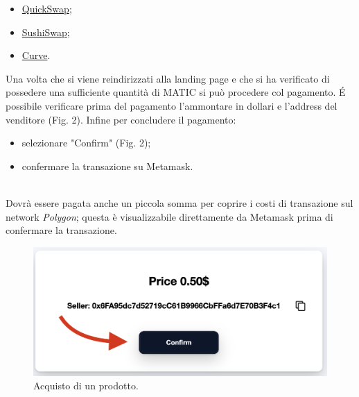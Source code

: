 \documentclass[a4paper, 12pt]{article}
\begin{document}
\begin{itemize}
\item \href{https://www.quickswap.exchange}{QuickSwap};
\item \href{https://app.sushi.com/}{SushiSwap};
\item \href{https://polygon.curve.fi/}{Curve}.
\end{itemize}
Una volta che si viene reindirizzati alla landing page e che si ha verificato di possedere una sufficiente quantità di MATIC si può procedere col pagamento. É possibile verificare prima del pagamento l'ammontare in dollari e l'address del venditore (Fig. 2). Infine per concludere il pagamento:
\begin{itemize}
\item selezionare "Confirm" (Fig. 2);
\item confermare la transazione su Metamask.
\end{itemize}
\mbox{}\\
Dovrà essere pagata anche un piccola somma per coprire i costi di transazione sul network \textit{Polygon}; questa è visualizzabile direttamente da Metamask prima di confermare la transazione.\\
\FloatBarrier
\begin{figure}[!h]
\centering
\includegraphics[width=0.7\linewidth]{img/oggetto_in_vendita.png}
\caption{Acquisto di un prodotto.}
\end{figure}
\FloatBarrier

\newpage
\end{document}
